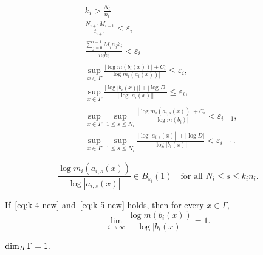 \documentclass[10pt,a4paper]{amsart}
\newcommand{\eps}{\varepsilon}
\begin{document}
\begin{align}
  \label{eq:k_i-1}
  & k_i > \frac{ N_i }{ n_i } \\
  \label{eq:k_i-2}
  & \frac{ N_{i + 1 } M_{ i + 1 } }{ t_{i+1} } < \eps_i \\
  \label{eq:k_i-3}
  & \frac{ \sum_{ j = 0 }^{i - 1} M_j n_j k_j }{ n_{i} k_{i}} < \eps_i \\
  \label{eq:k-4-new}
  &\sup_{x \in \Gamma}
  \frac{ |\log m (b_{i} (x)) | + \widetilde C_{i} }{ |\log m_i (a_i (x) )| }
  \le \eps_i, \\
  \label{eq:k-5-new}
  &\sup_{ x \in \Gamma}
   \frac{ \big|\log |b_i (x) |\big| +  |\log D| }{\big|\log |a_i(x)|\big|}
  \le \eps_i
  , \\
  \label{eq:k-6-new}
  &\sup_{x \in \Gamma}
  \sup_{1 \le s \le N_i}
  \frac{|\log m_i( a_{i,s} (x) )| + \widetilde C_{i} }{  | \log m (b_i) |  }
  <\eps_{i-1}
  , \\
  \label{eq:k-7-new}
  &\sup_{ x \in \Gamma }
  \sup_{1 \le s \le N_i}
  \frac{\big|\log |a_{i,s}(x)|\big| + |\log D| }{ \big| \log |b_i(x)|\big| } < \eps_{i - 1}.
\end{align}

\begin{equation} \label{eq:geom-meas-uni}
  \frac{ \log m_i (a_{i,s} (x)) }{ \log |a_{i,s} (x)| } \in B_{\eps_i} ( 1 )
  \quad \text{for all } N_i \le s \le k_i n_i
  .
\end{equation}

\begin{lemma}\label{lem:bi-1}
  If~\eqref{eq:k-4-new} and~\eqref{eq:k-5-new} holds, then for every $x \in \Gamma$,
  \[
    \lim_{ i \to \infty }
    \frac{ \log m ( b_{ i } (x) ) }{ \log | b_{ i} (x) | }
    = 1
    .
  \]
\end{lemma}

\begin{lemma}\label{lem:dim}
  $
    \dim_{\rm H} \Gamma  = 1
    .
  $
\end{lemma}
\end{document}
